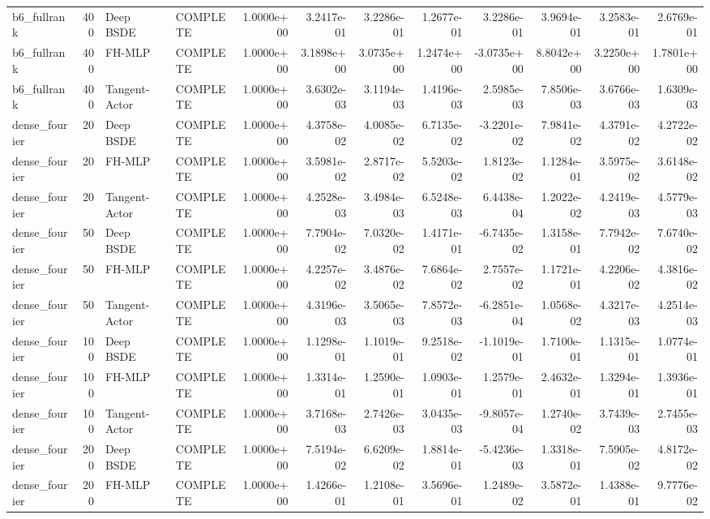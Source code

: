 \begin{tabular}{lrllrrrrrrrr}
b6\_fullrank & 400 & Deep BSDE & COMPLETE & 1.0000e+00 & 3.2417e-01 & 3.2286e-01 & 1.2677e-01 & 3.2286e-01 & 3.9694e-01 & 3.2583e-01 & 2.6769e-01 \\
b6\_fullrank & 400 & FH-MLP & COMPLETE & 1.0000e+00 & 3.1898e+00 & 3.0735e+00 & 1.2474e+00 & -3.0735e+00 & 8.8042e+00 & 3.2250e+00 & 1.7801e+00 \\
b6\_fullrank & 400 & Tangent-Actor & COMPLETE & 1.0000e+00 & 3.6302e-03 & 3.1194e-03 & 1.4196e-03 & 2.5985e-03 & 7.8506e-03 & 3.6766e-03 & 1.6309e-03 \\
dense\_fourier & 20 & Deep BSDE & COMPLETE & 1.0000e+00 & 4.3758e-02 & 4.0085e-02 & 6.7135e-02 & -3.2201e-02 & 7.9841e-02 & 4.3791e-02 & 4.2722e-02 \\
dense\_fourier & 20 & FH-MLP & COMPLETE & 1.0000e+00 & 3.5981e-02 & 2.8717e-02 & 5.5203e-02 & 1.8123e-02 & 1.1284e-01 & 3.5975e-02 & 3.6148e-02 \\
dense\_fourier & 20 & Tangent-Actor & COMPLETE & 1.0000e+00 & 4.2528e-03 & 3.4984e-03 & 6.5248e-03 & 6.4438e-04 & 1.2022e-02 & 4.2419e-03 & 4.5779e-03 \\
dense\_fourier & 50 & Deep BSDE & COMPLETE & 1.0000e+00 & 7.7904e-02 & 7.0320e-02 & 1.4171e-01 & -6.7435e-02 & 1.3158e-01 & 7.7942e-02 & 7.6740e-02 \\
dense\_fourier & 50 & FH-MLP & COMPLETE & 1.0000e+00 & 4.2257e-02 & 3.4876e-02 & 7.6864e-02 & 2.7557e-02 & 1.1721e-01 & 4.2206e-02 & 4.3816e-02 \\
dense\_fourier & 50 & Tangent-Actor & COMPLETE & 1.0000e+00 & 4.3196e-03 & 3.5065e-03 & 7.8572e-03 & -6.2851e-04 & 1.0568e-02 & 4.3217e-03 & 4.2514e-03 \\
dense\_fourier & 100 & Deep BSDE & COMPLETE & 1.0000e+00 & 1.1298e-01 & 1.1019e-01 & 9.2518e-02 & -1.1019e-01 & 1.7100e-01 & 1.1315e-01 & 1.0774e-01 \\
dense\_fourier & 100 & FH-MLP & COMPLETE & 1.0000e+00 & 1.3314e-01 & 1.2590e-01 & 1.0903e-01 & 1.2579e-01 & 2.4632e-01 & 1.3294e-01 & 1.3936e-01 \\
dense\_fourier & 100 & Tangent-Actor & COMPLETE & 1.0000e+00 & 3.7168e-03 & 2.7426e-03 & 3.0435e-03 & -9.8057e-04 & 1.2740e-02 & 3.7439e-03 & 2.7455e-03 \\
dense\_fourier & 200 & Deep BSDE & COMPLETE & 1.0000e+00 & 7.5194e-02 & 6.6209e-02 & 1.8814e-01 & -5.4236e-03 & 1.3318e-01 & 7.5905e-02 & 4.8172e-02 \\
dense\_fourier & 200 & FH-MLP & COMPLETE & 1.0000e+00 & 1.4266e-01 & 1.2108e-01 & 3.5696e-01 & 1.2489e-02 & 3.5872e-01 & 1.4388e-01 & 9.7776e-02 \\

\end{tabular}
